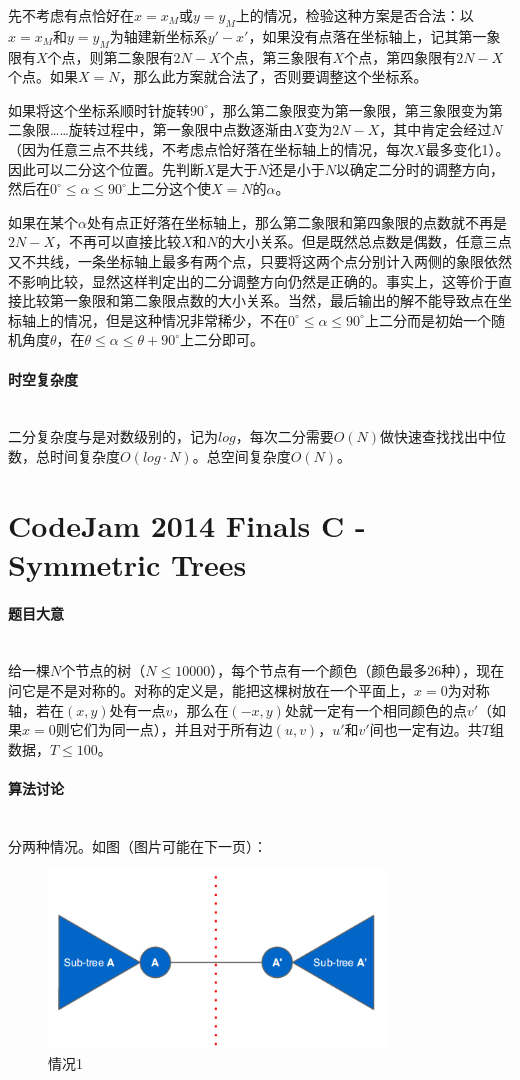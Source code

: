 \documentclass[UTF8]{ctexart}
\newcommand{\myparagraph}[1]{\paragraph{#1}\mbox{}\\}
\theoremstyle{nonumberplain}
\begin{document}
			先不考虑有点恰好在$x=x_M$或$y=y_M$上的情况，检验这种方案是否合法：以$x=x_M$和$y=y_M$为轴建新坐标系$y'-x'$，如果没有点落在坐标轴上，记其第一象限有$X$个点，则第二象限有$2N-X$个点，第三象限有$X$个点，第四象限有$2N-X$个点。如果$X=N$，那么此方案就合法了，否则要调整这个坐标系。
			
			如果将这个坐标系顺时针旋转$90^\circ$，那么第二象限变为第一象限，第三象限变为第二象限……旋转过程中，第一象限中点数逐渐由$X$变为$2N-X$，其中肯定会经过$N$（因为任意三点不共线，不考虑点恰好落在坐标轴上的情况，每次$X$最多变化1）。因此可以二分这个位置。先判断$X$是大于$N$还是小于$N$以确定二分时的调整方向，然后在$0^\circ \leq \alpha \leq 90^\circ$上二分这个使$X=N$的$\alpha$。
			
			如果在某个$\alpha$处有点正好落在坐标轴上，那么第二象限和第四象限的点数就不再是$2N-X$，不再可以直接比较$X$和$N$的大小关系。但是既然总点数是偶数，任意三点又不共线，一条坐标轴上最多有两个点，只要将这两个点分别计入两侧的象限依然不影响比较，显然这样判定出的二分调整方向仍然是正确的。事实上，这等价于直接比较第一象限和第二象限点数的大小关系。当然，最后输出的解不能导致点在坐标轴上的情况，但是这种情况非常稀少，不在$0^\circ \leq \alpha \leq 90^\circ$上二分而是初始一个随机角度$\theta$，在$\theta \leq \alpha \leq \theta+90^\circ$上二分即可。
		
		\myparagraph{时空复杂度}
		
			二分复杂度与是对数级别的，记为$log$，每次二分需要$O(N)$做快速查找找出中位数，总时间复杂度$O(log \cdot N)$。总空间复杂度$O(N)$。
	
	\section{CodeJam 2014 Finals C - Symmetric Trees}
	
		\myparagraph{题目大意}
	
			给一棵$N$个节点的树（$N \leq 10000$），每个节点有一个颜色（颜色最多26种），现在问它是不是对称的。对称的定义是，能把这棵树放在一个平面上，$x=0$为对称轴，若在$(x,y)$处有一点$v$，那么在$(-x,y)$处就一定有一个相同颜色的点$v'$（如果$x=0$则它们为同一点），并且对于所有边$(u,v)$，$u'$和$v'$间也一定有边。共$T$组数据，$T \leq 100$。
	
		\myparagraph{算法讨论}
		
			分两种情况。如图（图片可能在下一页）：
			
			\begin{figure}[ht]
				\centering
				\includegraphics[width=0.8\textwidth]{figgcj2014c_1.png}
				\caption{情况1}
			\end{figure}
			
\end{document}
